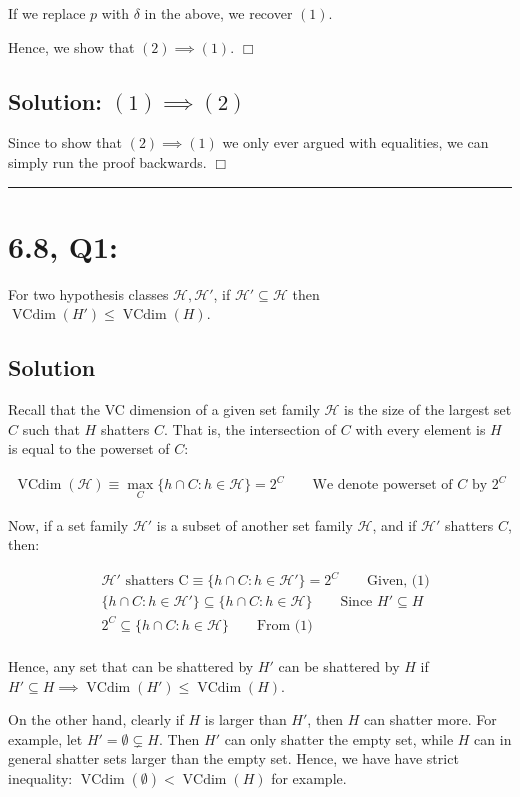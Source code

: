 \documentclass[11pt]{article}
\renewcommand{\H}{\ensuremath{\mathcal{H}}}
\DeclareMathOperator{\vcdim}{VCdim}
\newcommand{\Vcdim}{\ensuremath{\vcdim}}
\def\qed{$\Box$}
\begin{document}
If we replace $p$ with $\delta$ in the above, we recover $(1)$.

Hence, we show that $(2) \implies (1)$. \qed



\subsection*{Solution: $(1) \implies (2)$ }

Since to show that $(2) \implies (1)$ we only ever argued with equalities,
we can simply run the proof backwards. \qed

\rule{\textwidth}{1pt}


\section*{6.8, Q1:} For two hypothesis classes $\H, \H'$, if $\H' \subseteq \H$
then $\vcdim(H') \leq \vcdim(H)$.
\subsection*{Solution}
Recall that the VC dimension of a given set family $\H$ is the size of
the largest set $C$ such that $H$ shatters $C$. That is, the intersection of $C$
with every element is $H$ is equal to the powerset of $C$:

\begin{align*}
\Vcdim(\H) \equiv \max_{C} \{ h \cap C : h \in \H \} = 2^C \qquad \text{We denote powerset of $C$ by $2^C$ }
\end{align*}

Now, if a set family $\H'$ is a subset of another set family $\H$, and if $\H'$
shatters $C$, then:

\begin{align*}
    &\H' \text{ shatters C} \equiv  \{ h \cap C : h \in \H'\} = 2^C \qquad \text{Given, (1)}\\
    &\{ h \cap C : h \in \H' \} \subseteq \{ h \cap C : h \in \H \} \qquad \text{Since $H' \subseteq H$} \\
    &2^C \subseteq \{ h \cap C : h \in \H \}  \qquad \text{From (1)} \\
\end{align*}

Hence, any set that can be shattered by $H'$ can be shattered by $H$ if
$H' \subseteq H \implies \vcdim(H') \leq \vcdim(H)$.

On the other hand, clearly if $H$ is larger than $H'$, then $H$ can shatter more.
For example, let $H' = \emptyset \subsetneq H$. Then $H'$ can only shatter the empty
set, while $H$ can in general shatter sets larger than the empty set. Hence,
we have have strict inequality: $\vcdim(\emptyset) < \vcdim(H)$ for example.
\end{document}
